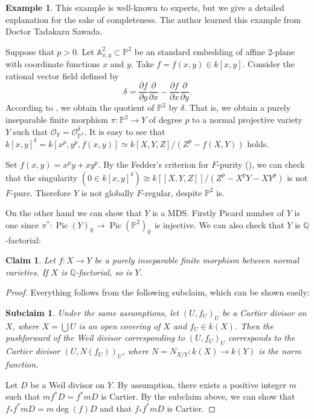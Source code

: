 \documentclass[12pt,twoside]{amsart}
\newtheorem*{claim}{Claim}
\newtheorem*{subclaim}{Subclaim}
\theoremstyle{definition}
\newtheorem{exmp}[theo]{Example}
\newcommand\Pic{\mathop{\mathrm{Pic}}\nolimits}
\newcommand\bq{\mathbb{Q}}
\newcommand\br{\mathbb{R}}
\newcommand\OO{\mathcal{O}}
\begin{document}
\begin{exmp}\label{globally F-regular is not preserved}
This example is well-known to experts, but we give a detailed explanation for the sake of completeness.
The author learned this example from Doctor Tadakazu Sawada.

Suppose that $p>0$. Let $\mathbb{A}^{2}_{x,y}\subset\mathbb{P}^2$ be an standard embedding of affine $2$-plane
with coordinate functions $x$ and $y$. Take $f=f(x,y)\in k[x,y]$.
Consider the rational vector field defined by
\begin{equation*}
\delta=\frac{\partial f}{\partial y}\frac{\partial}{\partial x}-\frac{\partial f}{\partial x}\frac{\partial}{\partial y}.
\end{equation*}
According to \cite{rs}, we obtain the quotient of $\mathbb{P}^2$ by $\delta$.
That is, we obtain a purely inseparable finite morphism $\pi:\mathbb{P}^2\to Y$ of degree $p$
to a normal projective variety $Y$ such that $\OO_Y=\OO_{\mathbb{P}^2}^{\delta}$.
It is easy to see that $k[x,y]^{\delta}=k[x^p,y^p,f(x,y)]\simeq k[X,Y,Z]/(Z^p-f(X,Y))$ holds.

Set $f(x,y)=x^py+xy^p$. By the Fedder's criterion for $F$-purity (\cite[Proposition 1.7]{fe}),
we can check that
the singularity $(0\in k[x,y]^{\delta})\cong k[[X,Y,Z]]/(Z^p-X^pY-XY^p)$ is not $F$-pure.
Therefore $Y$ is not globally $F$-regular, despite $\mathbb{P}^2$ is.

On the other hand we can show that $Y$ is a MDS.
Firstly Picard number of $Y$ is one since $\pi^{*}:\Pic{(Y)}_{\br}\to \Pic{(\mathbb{P}^{2})}_{\br}$ is
injective. We can also check that $Y$ is $\bq$-factorial:
\begin{claim}
Let $f:X\to Y$ be a purely inseparable finite morphism between normal varieties. If $X$ is $\bq$-factorial, so is
$Y$.
\end{claim}

\begin{proof}
Everything follows from the following subclaim, which can be shown easily:
\begin{subclaim}
Under the same assumptions, let $(U,f_U)_U$ be a Cartier divisor on $X$, where $X=\bigcup U$ is an
open covering of $X$ and $f_U\in k(X)$. Then the pushforward of the Weil divisor corresponding to
$(U,f_U)_U$ corresponds to the Cartier divisor $(U,N(f_U))_{U}$, where $N=N_{X/Y}:k(X)\to k(Y)$ is the
norm function.
\end{subclaim}

Let $D$ be a Weil divisor on $Y$. By assumption, there exists a positive integer $m$ such that
$mf^{*}D=f^{*}mD$ is Cartier. By the subclaim above, we can show that
$f_{*}f^{*}mD=m\deg{(f)}D$ and that $f_{*}f^{*}mD$ is Cartier.
\end{proof}
\end{exmp}
\end{document}
